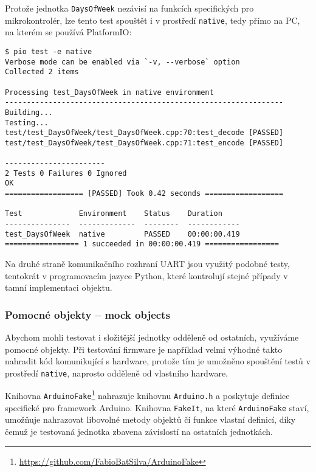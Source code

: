 Protože jednotka \texttt{DaysOfWeek} nezávisí na funkcích specifických pro
mikrokontrolér, lze tento test spouštět i v prostředí \texttt{native}, tedy
přímo na PC, na kterém se používá PlatformIO:
\begin{lstlisting}[style=terminal,columns=fixed]
$ pio test -e native
Verbose mode can be enabled via `-v, --verbose` option
Collected 2 items

Processing test_DaysOfWeek in native environment
----------------------------------------------------------------
Building...
Testing...
test/test_DaysOfWeek/test_DaysOfWeek.cpp:70:test_decode	[PASSED]
test/test_DaysOfWeek/test_DaysOfWeek.cpp:71:test_encode	[PASSED]

-----------------------
2 Tests 0 Failures 0 Ignored
OK
================== [PASSED] Took 0.42 seconds ==================

Test             Environment    Status    Duration
---------------  -------------  --------  ------------
test_DaysOfWeek  native         PASSED    00:00:00.419
================= 1 succeeded in 00:00:00.419 =================
\end{lstlisting}

Na druhé straně komunikačního rozhraní UART jsou využitý podobné testy,
tentokrát v programovacím jazyce Python, které kontrolují stejné případy
v tamní implementaci objektu.


\subsubsection{Pomocné objekty -- mock objects}
Abychom mohli testovat i složitější jednotky odděleně od ostatních, využíváme
pomocné objekty. Při testování firmware je například velmi výhodné takto
nahradit kód komunikující s hardware, protože tím je umožněno spouštění testů
v prostředí \texttt{native}, naprosto odděleně od vlastního hardware.

Knihovna
\texttt{ArduinoFake}\footnote{\url{https://github.com/FabioBatSilva/ArduinoFake}}
nahrazuje knihovnu \texttt{Arduino.h} a poskytuje definice specifické pro
framework Arduino. Knihovna \texttt{FakeIt}, na které \texttt{ArduinoFake}
staví, umožňuje nahrazovat libovolné metody objektů či funkce vlastní definicí,
díky čemuž je testovaná jednotka zbavena závislostí na ostatních jednotkách.

